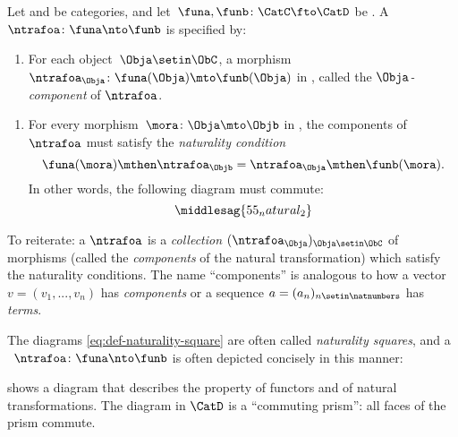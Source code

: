 

\begin{ctdefinition}
    \label{def:natural-transformation}
    Let \CatC and \CatD be categories, and let~$\funa,\funb\colon \CatC\fto \CatD$ be .
    A ~$\ntrafoa \colon \funa \nto \funb$ is specified by:

    \constit
    \begin{enumerate}
        \item For each object~$\Obja\setin \ObC$, a morphism $\ntrafoa_\Obja \colon \funa(\Obja)\mto \funb(\Obja)$ in \CatD, called the $\Obja$\emph{-component} of $\ntrafoa$.
    \end{enumerate}
    \condit
    \begin{enumerate}
        \item For every morphism~$\mora\colon \Obja\mto \Objb$ in \CatC, the components of $\ntrafoa$ must satisfy the \emph{naturality condition}
              \begin{equation}
                  \funa(\mora)\mthen \ntrafoa_\Objb = \ntrafoa_\Obja\mthen \funb(\mora).
              \end{equation}
              In other words, the following diagram must commute:
              \begin{equation}
                  \label{eq:def-naturality-square}
                  \middlesag{55_natural_2}
              \end{equation}
    \end{enumerate}
\end{ctdefinition}

To reiterate: a  $\ntrafoa$ is a \emph{collection} $(\ntrafoa_\Obja)_{\Obja \setin \ObC}$ of morphisms (called the \emph{components} of the natural transformation) which satisfy the naturality conditions.
The name ``components'' is analogous to how a vector $v = (v_1, .
    .., v_n)$ has \emph{components} or a sequence $a = (a_n)_{n \setin \natnumbers}$ has \emph{terms}.

The diagrams \cref{eq:def-naturality-square} are often called \emph{naturality squares}, and a ~$\ntrafoa \colon \funa\nto \funb$ is often depicted concisely in this manner:

 shows a diagram that describes the property of functors and of natural transformations.
The diagram in $\CatD$ is a ``commuting prism'': all faces of the prism commute.

